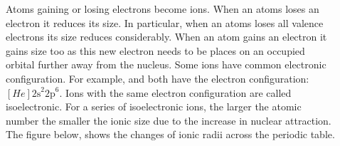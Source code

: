 \documentclass[main.tex]{subfiles}
\begin{document}
\begin{description}
  

\item[] 
Atoms gaining or losing electrons become ions. When an atoms loses an electron it reduces its size. In particular, when an atoms loses all valence electrons its size reduces considerably. When an atom gains an electron it gains size too as this new electron needs to be places on an occupied orbital further away from the nucleus.
Some ions have common electronic configuration. For example,  and   both have the electron configuration: $[He] \text{2s}^2 \text{2p}^6$. Ions with the same electron configuration are called isoelectronic. For a series of isoelectronic ions, the larger the atomic number the smaller the ionic size due to the increase in nuclear attraction. The figure below, shows the changes of ionic radii across the periodic table.




\end{description}


\newpage
\end{document}
